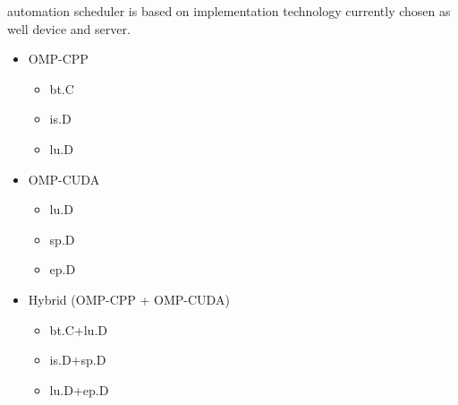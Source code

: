 \begin{itemize}
    automation scheduler is based on implementation technology currently
    chosen as well device and server.
        \begin{itemize}
            \item OMP-CPP
            \begin{itemize}
                \item bt.C
                \item is.D
                \item lu.D
            \end{itemize}
        \end{itemize}
        \begin{itemize}
            \item OMP-CUDA
            \begin{itemize}
                \item lu.D
                \item sp.D
                \item ep.D
            \end{itemize}
        \end{itemize}
        \begin{itemize}
            \item Hybrid (OMP-CPP + OMP-CUDA)
            \begin{itemize}
                \item bt.C+lu.D
                \item is.D+sp.D
                \item lu.D+ep.D
            \end{itemize}
        \end{itemize}


\end{itemize}
